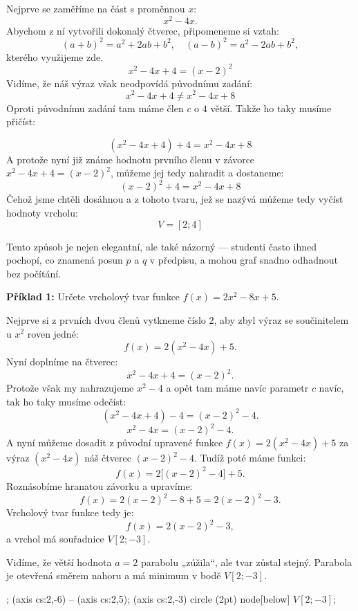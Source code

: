 \documentclass[12pt,a4paper]{article}
\begin{document}
\medskip
Nejprve se zaměříme na část s proměnnou \(x\):
\[
x^2 - 4x.
\]
Abychom z ní vytvořili dokonalý čtverec, připomeneme si vztah:
\[
(a + b)^2 = a^2 + 2ab + b^2, \quad (a - b)^2 = a^2 - 2ab + b^2,
\]
kterého využijeme zde. 
\[
x^2 - 4x + 4 = (x - 2)^2 
\]
Vidíme, že náš výraz však neodpovídá původnímu zadání:
\[
x^2 - 4x + 4 \neq x^2 - 4x + 8
\]
Oproti původnímu zadání tam máme člen $c$ o $4$ větší. Takže ho taky musíme přičíst:

\[
(x^2 - 4x + 4) + 4 = x^2 - 4x + 8
\]
A protože nyní již známe hodnotu prvního členu v závorce $x^2 - 4x + 4 = (x - 2)^2 $, můžeme jej tedy nahradit a dostaneme:
\[
(x - 2)^2 + 4 = x^2 - 4x + 8
\]
Čehož jsme chtěli dosáhnou a z tohoto tvaru, jež se nazývá  můžeme tedy vyčíst hodnoty vrcholu:
\[
V=[2;4]
\]

\medskip
Tento způsob je nejen elegantní, ale také názorný — studenti často ihned pochopí, co znamená posun \(p\) a \(q\) v předpisu, a mohou graf snadno odhadnout bez počítání.

\begin{examplebox}
\textbf{Příklad 1:}  
Určete vrcholový tvar funkce \(f(x) = 2x^2 - 8x + 5.\)

\medskip
Nejprve si z prvních dvou členů vytkneme číslo \(2\), aby zbyl výraz se součinitelem u \(x^2\) roven jedné:
\[
f(x) = 2(x^2 - 4x) + 5.
\]
Nyní doplníme na čtverec:
\[
x^2 - 4x + 4 = (x - 2)^2.
\]
Protože však my nahrazujeme $x^2 - 4$ a opět tam máme navíc parametr $c$ navíc, tak ho taky musíme odečíst:
\[
(x^2 - 4x + 4) - 4 = (x - 2)^2 - 4.
\]
\[
x^2 - 4x = (x - 2)^2 - 4.
\]
A nyní můžeme dosadit z původní upravené funkce $f(x) = 2(x^2 - 4x) + 5$ za výraz $(x^2 - 4x)$ náš čtverec $(x - 2)^2 - 4$.
Tudíž poté máme funkci:
\[
f(x) = 2\big[(x - 2)^2 - 4\big] + 5.
\]
Roznásobíme hranatou závorku a upravíme:
\[
f(x) = 2(x - 2)^2 - 8 + 5 = 2(x - 2)^2 - 3.
\]
Vrcholový tvar funkce tedy je:
\[
f(x) = 2(x - 2)^2 - 3,
\]
a vrchol má souřadnice \(V[2; -3].\)

\medskip
Vidíme, že větší hodnota \(a = 2\) parabolu „zúžila“, ale tvar zůstal stejný.  
Parabola je otevřená směrem nahoru a má minimum v bodě \(V[2; -3].\)
\end{examplebox}

\begin{center}
\begin{axisgraph}[
  xmin=-1, xmax=5,
  ymin=-4, ymax=5,
  samples=200,
  width=9cm,
  height=7cm,
  title={$y = 2x^2 - 8x + 5 = 2(x - 2)^2 - 3$}
]
  ;
   (axis cs:2,-6) -- (axis cs:2,5);
   (axis cs:2,-3) circle (2pt) node[below] {$V[2;-3]$};
\end{axisgraph}
\end{center}
\end{document}
